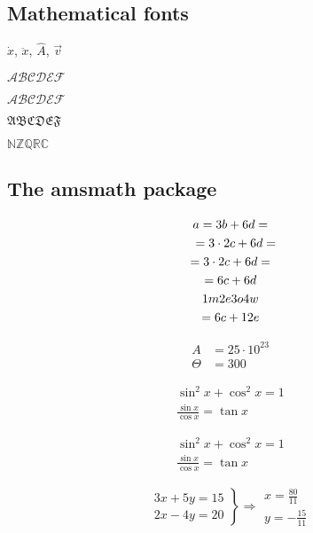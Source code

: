 \documentclass[a4paper]{article}
\begin{document}
    \subsection{Mathematical fonts}
    $\dot{x}$, $\ddot{x}$, $\hat{A}$, $\vec{v}$

    $\mathcal{ABCDEF}$

    $\mathscr{ABCDEF}$

    $\mathfrak{ABCDEF}$

    $\mathbb{NZQRC}$

    \subsection{The amsmath package}
    \begin{multline}
        a=3b+6d=\\
        \shoveleft{=3\cdot 2c+6d=}\\
        =3\cdot 2c+6d=\\
        =6c+6d\\
        1m2e3o4w\\
        =6c+12e
    \end{multline}

    \[
    \begin{split}
        A&=25\cdot10^{23}\\
        \Theta&=300
    \end{split}
    \]

    \begin{gather}
        \sin^2x+\cos^2x=1\\
        \frac{\sin x}{\cos x}=\tan x
    \end{gather}

    \begin{equation}
        \begin{gathered}
            \sin^2x+\cos^2x=1\\
            \frac{\sin x}{\cos x}=\tan x
        \end{gathered}
    \end{equation}

    \[
    \left.
    \begin{gathered}
        3x+5y=15\\
        2x-4y=20
    \end{gathered}\right\} \Longrightarrow
    \begin{gathered}
        x=\frac{80}{11}\\
        y=-\frac{15}{11}
    \end{gathered}
    \]
\end{document}
